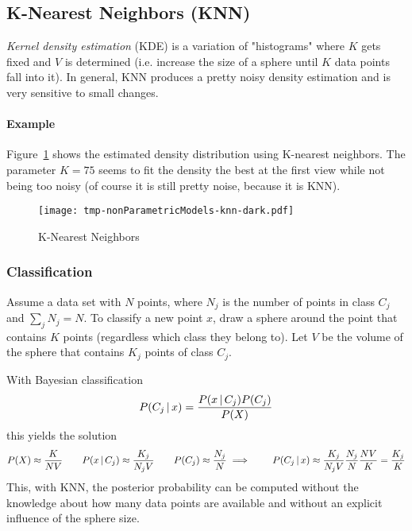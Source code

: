 		\subsection{K-Nearest Neighbors (KNN)}
			\emph{Kernel density estimation} (KDE) is a variation of "histograms" where \(K\) gets fixed and \(V\) is determined (i.e. increase the size of a sphere until \(K\) data points fall into it). In general, KNN produces a pretty noisy density estimation and is very sensitive to small changes.

			\paragraph{Example}
				Figure~\ref{fig:knn} shows the estimated density distribution using K-nearest neighbors. The parameter \( K = 75 \) seems to fit the density the best at the first view while not being too noisy (of course it is still pretty noise, because it is KNN).

				\begin{figure}
					\centering
					\texttt{[image: tmp-nonParametricModels-knn-dark.pdf]}
					\caption{K-Nearest Neighbors}
					\label{fig:knn}
				\end{figure}

			\subsubsection{Classification}
				Assume a data set with \(N\) points, where \(N_j\) is the number of points in class \(C_j\) and \( \sum_j N_j = N \). To classify a new point \(x\), draw a sphere around the point that contains \(K\) points (regardless which class they belong to). Let \(V\) be the volume of the sphere that contains \(K_j\) points of class \(C_j\).

				With Bayesian classification
				\begin{equation}
					P(C_j \,\vert\, x) = \frac{P(x \,\vert\, C_j) P(C_j)}{P(X)}
				\end{equation}
				this yields the solution
				\begin{equation}
					P(X) \approx \frac{K}{NV} \qquad P(x \,\vert\, C_j) \approx \frac{K_j}{N_jV} \qquad P(C_j) \approx \frac{N_j}{N} \\
					\implies\qquad P(C_j \,\vert\, x) \approx \frac{K_j}{N_jV} \frac{N_j}{N} \frac{NV}{K} = \frac{K_j}{K}
				\end{equation}
				This, with KNN, the posterior probability can be computed without the knowledge about how many data points are available and without an explicit influence of the sphere size.

